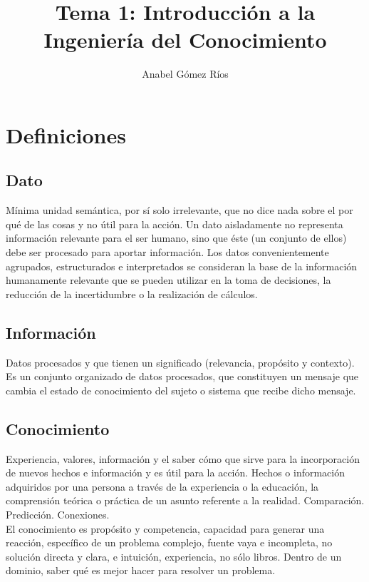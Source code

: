 \documentclass[12pt]{article}
\title{Tema 1: Introducción a la Ingeniería del Conocimiento}
\author{Anabel G\'omez R\'ios}
\begin{document}
\maketitle


\section{Definiciones}
\subsection{Dato}
Mínima unidad semántica, por sí solo irrelevante, que no dice nada sobre el por qué de las cosas y no útil para la acción. Un dato aisladamente no representa información relevante para el ser humano, sino que éste (un conjunto de ellos) debe ser procesado para aportar información. Los datos convenientemente agrupados, estructurados e interpretados se consideran la base de la información humanamente relevante que se pueden utilizar en la toma de decisiones, la reducción de la incertidumbre o la realización de cálculos.

\subsection{Información}
Datos procesados y que tienen un significado (relevancia, propósito y contexto). Es un conjunto organizado de datos procesados, que constituyen un mensaje que cambia el estado de conocimiento del sujeto o sistema que recibe dicho mensaje.

\subsection{Conocimiento}
Experiencia, valores, información y el saber cómo que sirve para la incorporación de nuevos hechos e información y es útil para la acción. Hechos o información adquiridos por una persona a través de la experiencia o la educación, la comprensión teórica o práctica de un asunto referente a la realidad. Comparación. Predicción. Conexiones.\\
El conocimiento es propósito y competencia, capacidad para generar una reacción, específico de un problema complejo, fuente vaya e incompleta, no solución directa y clara, e intuición, experiencia, no sólo libros. Dentro de un dominio, saber qué es mejor hacer para resolver un problema.
\end{document}
